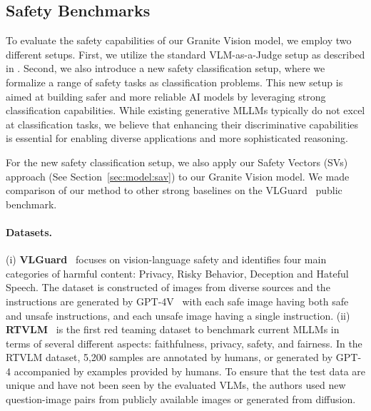 
\subsection{Safety Benchmarks}


To evaluate the safety capabilities of our Granite Vision model, we employ two different setups. First, we utilize the standard VLM-as-a-Judge setup as described in \citep{Li2024RedTV}. Second, we also introduce a new safety classification setup, where we formalize a range of safety tasks as classification problems. This new setup is aimed at building safer and more reliable AI models by leveraging strong classification capabilities. While existing generative MLLMs typically do not excel at classification tasks, we believe that enhancing their discriminative capabilities is essential for enabling diverse applications and more sophisticated reasoning.


For the new safety classification setup, we also apply our Safety Vectors (SVs) approach (See Section~\ref{sec:model:sav}) to our Granite Vision model. We made comparison of our method to other strong baselines on the VLGuard~\citep{zong2024safety} public benchmark.



\paragraph{Datasets.} (i) \textbf{VLGuard}~\citep{zong2024safety} focuses on vision-language safety and identifies four main categories of harmful content: Privacy, Risky Behavior, Deception and Hateful Speech. The dataset is constructed of images from diverse sources and the instructions are generated by GPT-4V~\citep{OpenAI2023GPT4TR} with each safe image having both safe and unsafe instructions, and each unsafe image having a single instruction. (ii) \textbf{RTVLM}~\citep{Li2024RedTV} is the first red teaming dataset to benchmark current MLLMs in terms of several different aspects: faithfulness, privacy, safety, and fairness. In the RTVLM dataset, 5,200 samples are annotated by humans, or generated by GPT-4 accompanied by examples provided by humans. To ensure that the test data are unique and have not been seen by the evaluated VLMs, the authors used new question-image pairs from publicly available images or generated from diffusion. 


